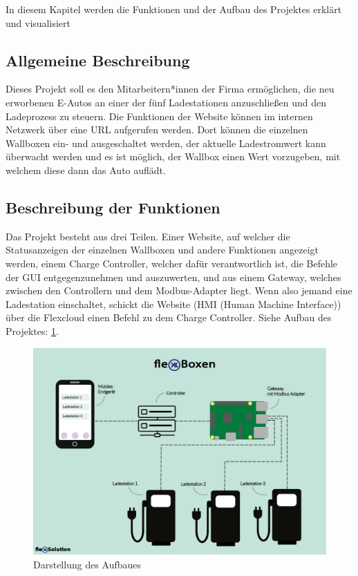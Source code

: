 In diesem Kapitel werden die Funktionen und der Aufbau des Projektes erklärt und visualisiert



\subsection{Allgemeine Beschreibung}


Dieses Projekt soll es den Mitarbeitern*innen der Firma ermöglichen, die neu erworbenen E-Autos an einer der fünf Ladestationen anzuschließen und den Ladeprozess zu steuern. Die Funktionen der Website können im internen Netzwerk über eine URL aufgerufen werden. Dort können die einzelnen Wallboxen ein- und ausgeschaltet werden, der aktuelle Ladestromwert kann überwacht werden und es ist möglich, der Wallbox einen Wert vorzugeben, mit welchem diese dann das Auto auflädt.


\subsection{Beschreibung der Funktionen}  \label{AufbauDesProjektesWallbox}
Das Projekt besteht aus drei Teilen. Einer Website, auf welcher die Statusanzeigen der einzelnen Wallboxen und andere Funktionen angezeigt werden, einem Charge Controller, welcher dafür verantwortlich ist, die Befehle der GUI entgegenzunehmen und auszuwerten, und aus einem Gateway, welches zwischen den Controllern und dem Modbus-Adapter liegt. Wenn also jemand eine Ladestation einschaltet, schickt die Website (HMI (Human Machine Interface)) über die Flexcloud einen Befehl zu dem Charge Controller.
Siehe Aufbau des Projektes: \ref{fig:impl:Infografik_FlexBoxen}.


\begin{figure}[h t]
\centering
\includegraphics[scale=0.7]{pics/Infografik_FlexBoxen2.png}
\caption{Darstellung des Aufbaues}
\label{fig:impl:Infografik_FlexBoxen}
\end{figure}


